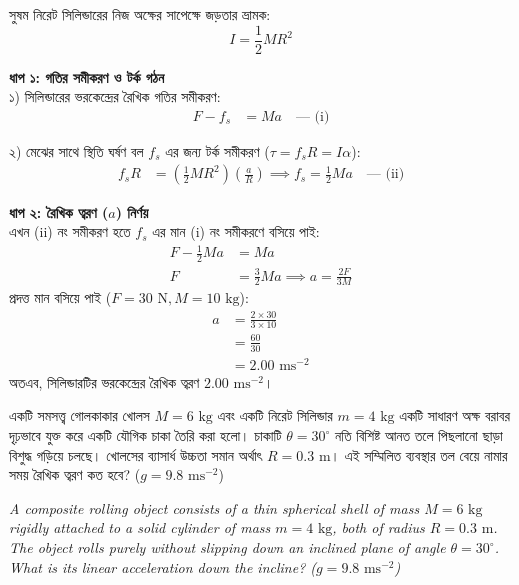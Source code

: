 \documentclass[12pt, a4paper]{article}
\begin{document}
\begin{tcolorbox}[solutionbox={সমাধান (Solution)}]
\noindent
সুষম নিরেট সিলিন্ডারের নিজ অক্ষের সাপেক্ষে জড়তার ভ্রামক:
\[I = \frac{1}{2} M R^2\]

\textbf{ধাপ ১: গতির সমীকরণ ও টর্ক গঠন} \\
১) সিলিন্ডারের ভরকেন্দ্রের রৈখিক গতির সমীকরণ:
\begin{align*}
    F - f_s &= M a \quad \text{--- (i)}
\end{align*}

২) মেঝের সাথে স্থিতি ঘর্ষণ বল $f_s$ এর জন্য টর্ক সমীকরণ ($\tau = f_s R = I \alpha$):
\begin{align*}
    f_s R &= \left(\frac{1}{2} M R^2\right) \left(\frac{a}{R}\right) \implies f_s = \frac{1}{2} M a \quad \text{--- (ii)}
\end{align*}

\vspace{0.5em}
\textbf{ধাপ ২: রৈখিক ত্বরণ ($a$) নির্ণয়} \\
এখন (ii) নং সমীকরণ হতে $f_s$ এর মান (i) নং সমীকরণে বসিয়ে পাই:
\begin{align*}
    F - \frac{1}{2} M a &= M a \\
    F &= \frac{3}{2} M a \implies a = \frac{2F}{3M}
\end{align*}
প্রদত্ত মান বসিয়ে পাই ($F = 30\text{ N}, M = 10\text{ kg}$):
\begin{align*}
    a &= \frac{2 \times 30}{3 \times 10} \\
      &= \frac{60}{30} \\
      &= \mathbf{2.00}\text{ ms}^{-2}
\end{align*}
অতএব, সিলিন্ডারটির ভরকেন্দ্রের রৈখিক ত্বরণ $2.00\text{ ms}^{-2}$।
\end{tcolorbox}

\begin{tcolorbox}[questionbox={প্রশ্ন (Question) 45}]
    \noindent
    একটি সমসত্ত্ব গোলকাকার খোলস $M = 6\text{ kg}$ এবং একটি নিরেট সিলিন্ডার $m = 4\text{ kg}$ একটি সাধারণ অক্ষ বরাবর দৃঢ়ভাবে যুক্ত করে একটি যৌগিক চাকা তৈরি করা হলো। চাকাটি $\theta = 30^\circ$ নতি বিশিষ্ট আনত তলে পিছলানো ছাড়া বিশুদ্ধ গড়িয়ে চলছে। খোলসের ব্যাসার্ধ উচ্চতা সমান অর্থাৎ $R = 0.3\text{ m}$। এই সম্মিলিত ব্যবস্থার তল বেয়ে নামার সময় রৈখিক ত্বরণ কত হবে? ($g = 9.8\text{ ms}^{-2}$)
    
    \vspace{0.8em}
    \begin{english}
    \noindent\textit{\color{darkgray}
    A composite rolling object consists of a thin spherical shell of mass $M = 6\text{ kg}$ rigidly attached to a solid cylinder of mass $m = 4\text{ kg}$, both of radius $R = 0.3\text{ m}$. The object rolls purely without slipping down an inclined plane of angle $\theta = 30^\circ$. What is its linear acceleration down the incline? ($g = 9.8\text{ ms}^{-2}$)
    }
    \end{english}
\end{tcolorbox}
\end{document}
